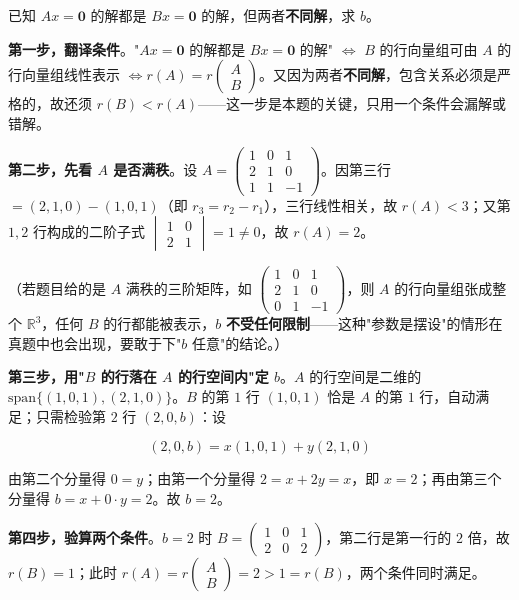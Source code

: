 \documentclass[11pt,openany,UTF8]{ctexbook}
\begin{document}
已知 $Ax=\mathbf{0}$ 的解都是 $Bx=\mathbf{0}$ 的解，但两者\textbf{不同解}，求 $b$。

\textbf{第一步，翻译条件}。"$Ax=\mathbf{0}$ 的解都是 $Bx=\mathbf{0}$ 的解" $\iff$ $B$ 的行向量组可由 $A$ 的行向量组线性表示 $\iff r(A)=r\begin{pmatrix} A \\ B \end{pmatrix}$。又因为两者\textbf{不同解}，包含关系必须是严格的，故还须 $r(B)<r(A)$——这一步是本题的关键，只用一个条件会漏解或错解。

\textbf{第二步，先看 $A$ 是否满秩}。设 $A=\begin{pmatrix} 1 & 0 & 1 \\ 2 & 1 & 0 \\ 1 & 1 & -1 \end{pmatrix}$。因第三行 $=(2,1,0)-(1,0,1)$（即 $r_3=r_2-r_1$），三行线性相关，故 $r(A)<3$；又第 $1,2$ 行构成的二阶子式 $\begin{vmatrix}1&0\\2&1\end{vmatrix}=1\ne0$，故 $r(A)=2$。

（若题目给的是 $A$ 满秩的三阶矩阵，如 $\begin{pmatrix} 1 & 0 & 1 \\ 2 & 1 & 0 \\ 0 & 1 & -1 \end{pmatrix}$，则 $A$ 的行向量组张成整个 $\mathbb{R}^3$，任何 $B$ 的行都能被表示，$b$ \textbf{不受任何限制}——这种"参数是摆设"的情形在真题中也会出现，要敢于下"$b$ 任意"的结论。）

\textbf{第三步，用"$B$ 的行落在 $A$ 的行空间内"定 $b$}。$A$ 的行空间是二维的 $\mathrm{span}\{(1,0,1),(2,1,0)\}$。$B$ 的第 $1$ 行 $(1,0,1)$ 恰是 $A$ 的第 $1$ 行，自动满足；只需检验第 $2$ 行 $(2,0,b)$：设

\[(2,0,b)=x(1,0,1)+y(2,1,0)\]

由第二个分量得 $0=y$；由第一个分量得 $2=x+2y=x$，即 $x=2$；再由第三个分量得 $b=x+0\cdot y=2$。故 \textbf{$b=2$}。

\textbf{第四步，验算两个条件}。$b=2$ 时 $B=\begin{pmatrix} 1 & 0 & 1 \\ 2 & 0 & 2 \end{pmatrix}$，第二行是第一行的 $2$ 倍，故 $r(B)=1$；此时 $r(A)=r\begin{pmatrix} A \\ B \end{pmatrix}=2>1=r(B)$，两个条件同时满足。
\end{document}
